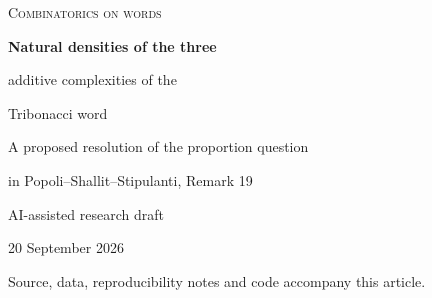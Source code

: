 \documentclass[11pt,a4paper]{article}
\theoremstyle{definition}
\theoremstyle{remark}
\begin{document}
\begin{titlepage}
\centering
\vspace*{12mm}
{\small\scshape Combinatorics on words\par}
\vspace{8mm}
{\LARGE\bfseries\color{Ink} Natural densities of the three\par
additive complexities of the\par Tribonacci word\par}
\vspace{6mm}
{\large A proposed resolution of the proportion question\par
in Popoli--Shallit--Stipulanti, Remark 19\par}
\vspace{8mm}
{AI-assisted research draft\par}
{20 September 2026\par}
\vspace{10mm}
\begin{minipage}{0.92\textwidth}
\begin{abstract}
The Tribonacci word is the fixed point of $0\mapsto01$, $1\mapsto02$,
$2\mapsto0$. Its additive complexity $a(n)$ counts the distinct sums of
length-$n$ factors. Popoli, Shallit and Stipulanti proved that the only values
for positive $n$ are $3,4,5$, and asked for their respective proportions.
We give an exact finite-certificate proof of the existence of the ordinary
natural densities and evaluate them in the cubic field of the Tribonacci
constant $\beta$, where $\beta^3=\beta^2+\beta+1$:
\[
 d_3=\frac{21\beta^2-38\beta+5}{22},\quad
 d_4=\frac{-55\beta^2+72\beta+67}{22},\quad
 d_5=\frac{17\beta^2-17\beta-25}{11}.
\]
For every integer cutoff $N$, not merely for Tribonacci-number cutoffs, the
count of lengths with value $j$ is $d_jN+O(N^\theta)$, where
$\theta=\log(7/5)/\log\beta<0.553$.
The proof reconstructs a 76-state output automaton using abelian
co-decomposition, verifies an exact algebraic left eigenvector and an
integer matrix annihilator, and controls arbitrary cutoffs by a disjoint
prefix-cylinder decomposition. The package includes the full transition and
eigenvector tables, a standard-library-only verifier, exact counting code,
and a separate all-factor check through length $2048$.
\end{abstract}
\vspace{3mm}
\noindent{}
\end{minipage}
\vfill
{\small Source, data, reproducibility notes and code accompany this article.\par}
\end{titlepage}
\end{document}
